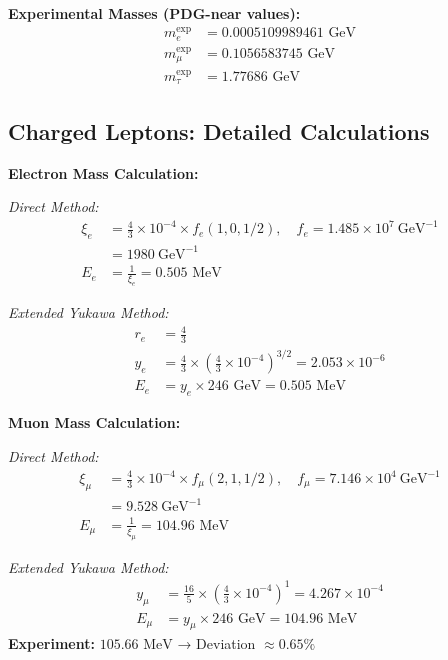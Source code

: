 	\textbf{Experimental Masses (PDG-near values):}
	\begin{align}
		m_e^{\text{exp}} &= 0.0005109989461 \text{ GeV} \\
		m_\mu^{\text{exp}} &= 0.1056583745 \text{ GeV} \\
		m_\tau^{\text{exp}} &= 1.77686 \text{ GeV}
	\end{align}
	
	\subsection{Charged Leptons: Detailed Calculations}
	\label{subsec:charged_leptons_detailed}
	
	\textbf{Electron Mass Calculation:}
	
	\textit{Direct Method:}
	\begin{align}
		\xi_e &= \frac{4}{3} \times 10^{-4} \times f_e(1,0,1/2), \quad f_e = 1.485 \times 10^{7}\ \text{GeV}^{-1} \\
		&= 1980\ \text{GeV}^{-1} \\
		E_{e} &= \frac{1}{\xi_e} = 0.505 \text{ MeV}
	\end{align}
	
	\textit{Extended Yukawa Method:}
	\begin{align}
		r_e &= \frac{4}{3} \\
		y_e &= \frac{4}{3} \times \left(\frac{4}{3} \times 10^{-4}\right)^{3/2} = 2.053 \times 10^{-6} \\
		E_e &= y_e \times 246 \text{ GeV} = 0.505 \text{ MeV}
	\end{align}
	
	\textbf{Muon Mass Calculation:}
	
	\textit{Direct Method:}
	\begin{align}
		\xi_\mu &= \frac{4}{3} \times 10^{-4} \times f_\mu(2,1,1/2), \quad f_\mu = 7.146 \times 10^{4}\ \text{GeV}^{-1} \\
		&= 9.528\ \text{GeV}^{-1} \\
		E_{\mu} &= \frac{1}{\xi_\mu} = 104.96 \text{ MeV}
	\end{align}
	
	\textit{Extended Yukawa Method:}
	\begin{align}
		y_\mu &= \frac{16}{5} \times \left(\frac{4}{3} \times 10^{-4}\right)^1 = 4.267 \times 10^{-4} \\
		E_\mu &= y_\mu \times 246 \text{ GeV} = 104.96 \text{ MeV}
	\end{align}
	\textbf{Experiment:} $105.66 \text{ MeV}$ → Deviation $\approx 0.65\%$

